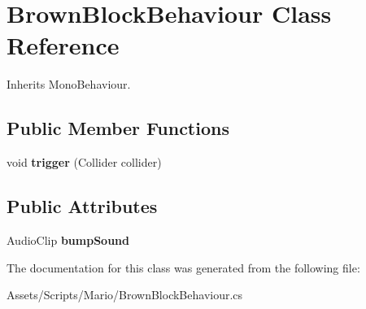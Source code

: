 \hypertarget{class_brown_block_behaviour}{\section{Brown\-Block\-Behaviour Class Reference}
\label{class_brown_block_behaviour}
}


Inherits Mono\-Behaviour.

\subsection*{Public Member Functions}
\begin{DoxyCompactItemize}
\item 
\hypertarget{class_brown_block_behaviour_a6d2c90c996a66a1a08d69a221851a92d}{void {\bfseries trigger} (Collider collider)}\label{class_brown_block_behaviour_a6d2c90c996a66a1a08d69a221851a92d}

\end{DoxyCompactItemize}
\subsection*{Public Attributes}
\begin{DoxyCompactItemize}
\item 
\hypertarget{class_brown_block_behaviour_a1ee16b6059bd810b3aeb2244d4928b3b}{Audio\-Clip {\bfseries bump\-Sound}}\label{class_brown_block_behaviour_a1ee16b6059bd810b3aeb2244d4928b3b}

\end{DoxyCompactItemize}


The documentation for this class was generated from the following file\-:\begin{DoxyCompactItemize}
\item 
Assets/\-Scripts/\-Mario/Brown\-Block\-Behaviour.\-cs\end{DoxyCompactItemize}
